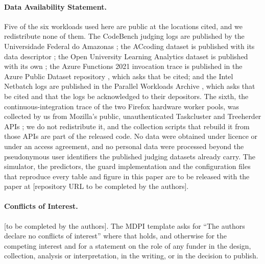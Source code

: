 \documentclass[11pt,a4paper]{article}
\theoremstyle{plain}
\theoremstyle{definition}
\theoremstyle{remark}
\begin{document}
\paragraph{Data Availability Statement.}
Five of the six workloads used here are public at the locations cited, and we
redistribute none of them. The CodeBench judging logs are published by the
Universidade Federal do Amazonas \cite{codebench_dataset}; the ACcoding dataset
is published with its data descriptor \cite{accoding2024}; the Open University
Learning Analytics dataset is published with its own \cite{oulad2017}; the Azure
Functions 2021 invocation trace is published in the Azure Public Dataset
repository \cite{azure2021trace}, which asks that \cite{zhang2021harvested} be
cited; and the Intel Netbatch logs are published in the Parallel Workloads
Archive \cite{netbatch2012trace}, which asks that \cite{shai2014netbatch} be
cited and that the logs be acknowledged to their depositors. The sixth, the
continuous-integration trace of the two Firefox hardware worker pools, was
collected by us from Mozilla's public, unauthenticated Taskcluster and
Treeherder APIs \cite{taskcluster_docs,treeherder_docs}; we do not redistribute
it, and the collection scripts that rebuild it from those APIs are part of the
released code. No data were obtained under licence or under an access agreement,
and no personal data were processed beyond the pseudonymous user identifiers the
published judging datasets already carry. The simulator, the predictors, the
guard implementation and the configuration files that reproduce every table and
figure in this paper are to be released with the paper at
[repository URL to be completed by the authors].

\paragraph{Conflicts of Interest.}
[to be completed by the authors]. The MDPI template asks for ``The authors
declare no conflicts of interest'' where that holds, and otherwise for the
competing interest and for a statement on the role of any funder in the design,
collection, analysis or interpretation, in the writing, or in the decision to
publish.


\end{document}
